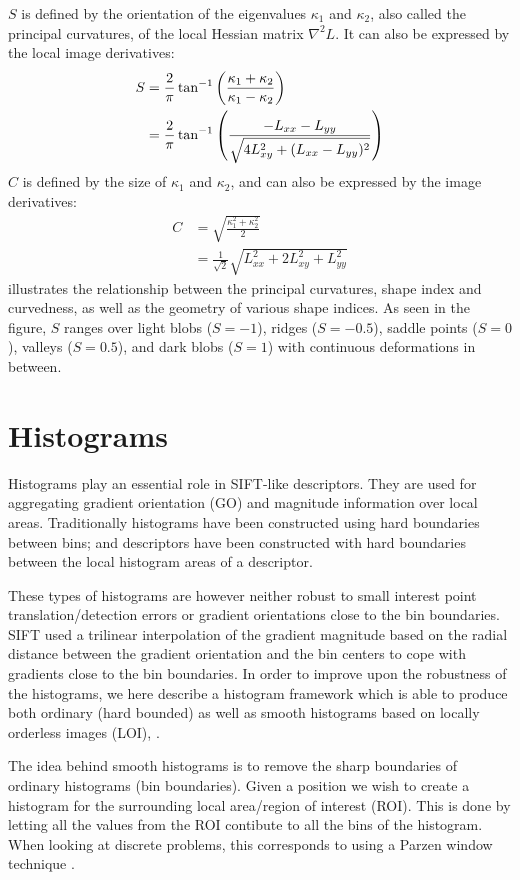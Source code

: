 \documentclass[thesis.tex]{subfiles}
\begin{document}
$S$ is defined by the orientation of the eigenvalues $\kappa_1$ and $\kappa_2$, also called the principal curvatures, of the local Hessian matrix $\nabla^2 L$. It can also be expressed by the local image derivatives:
%
\begin{align}
S &= \frac{2}{\pi} \tan^{-1} \left( \frac{\kappa_1 + \kappa_2}{\kappa_1 - \kappa_2} \right) \\
&= \frac{2}{\pi} \tan^{-1} \left( \frac{-L_{xx} - L_{yy}}{\sqrt{4 L_{xy}^2 + (L_{xx} - L_{yy})^2}} \right)
\end{align}
%
$C$ is defined by the size of $\kappa_1$ and $\kappa_2$, and can also be expressed by the image derivatives:
%
\begin{align}
C &= \sqrt{\frac{\kappa_1^2 + \kappa_2^2}{2}} \\
&= \frac{1}{\sqrt2} \sqrt{L_{xx}^2 + 2 L_{xy}^2 + L_{yy}^2}
\end{align}
%
 illustrates the relationship between the principal curvatures, shape index and curvedness, as well as the geometry of various shape indices. As seen in the figure, $S$ ranges over light blobs ($S = -1$), ridges ($S = -0.5$), saddle points ($S = 0$), valleys ($S = 0.5$), and dark blobs ($S = 1$) with continuous deformations in between.
%
\section{Histograms}
\label{sec:histograms}

Histograms play an essential role in SIFT-like descriptors. They are used for aggregating gradient orientation (GO) and magnitude information over local areas. Traditionally histograms have been constructed using hard boundaries between bins; and descriptors have been constructed with hard boundaries between the local histogram areas of a descriptor.

These types of histograms are however neither robust to small interest point translation/detection errors or gradient orientations close to the bin boundaries. SIFT used a trilinear interpolation of the gradient magnitude based on the radial distance between the gradient orientation and the bin centers to cope with gradients close to the bin boundaries. In order to improve upon the robustness of the histograms, we here describe a histogram framework which is able to produce both ordinary (hard bounded) as well as smooth histograms based on locally orderless images (LOI), \cite{koenderink1999structure}.

The idea behind smooth histograms is to remove the sharp boundaries of ordinary histograms (bin boundaries). Given a position we wish to create a histogram for the surrounding local area/region of interest (ROI). This is done by letting all the values from the ROI contibute to all the bins of the histogram. When looking at discrete problems, this corresponds to using a Parzen window technique \cite{parzen1962estimation}. 
\end{document}

